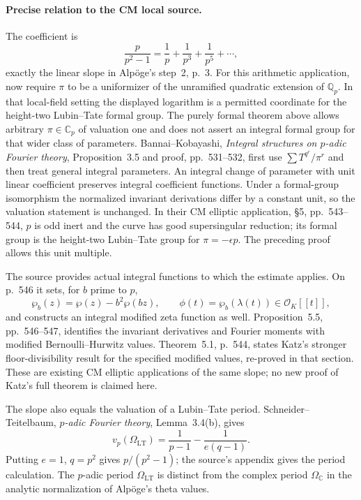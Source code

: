 \documentclass[11pt]{article}
\newcommand{\Q}{\mathbb Q}\newcommand{\C}{\mathbb C}\newcommand{\Z}{\mathbb Z}\newcommand{\R}{\mathbb R}\newcommand{\A}{\mathbb A}\newcommand{\OO}{\mathcal O}
\theoremstyle{definition}\newtheorem{definition}[theorem]{Definition}\newtheorem{remark}[theorem]{Remark}
\begin{document}
\paragraph{Precise relation to the CM local source.}
The coefficient is
\[
 \frac{p}{p^2-1}=\frac1p+\frac1{p^3}+\frac1{p^5}+\cdots,
\]
exactly the linear slope in Alp\"oge's step~2, p.~3.
For this arithmetic application, now require $\pi$ to be a
uniformizer of the unramified quadratic extension of $\Q_p$.
In that local-field setting the displayed logarithm is a permitted
coordinate for the height-two Lubin--Tate formal group.
The purely formal theorem above allows arbitrary $\pi\in\C_p$
of valuation one and does not assert an integral formal group for
that wider class of parameters.
Bannai--Kobayashi, \emph{Integral structures on $p$-adic Fourier
theory}, Proposition~3.5 and proof, pp.~531--532, first use
$\sum T^{q^r}/\pi^r$ and then treat general integral parameters.
An integral change of parameter with unit linear coefficient
preserves integral coefficient functions. Under a formal-group
isomorphism the normalized invariant derivations differ by a
constant unit, so the valuation statement is unchanged.
In their CM elliptic application, \S5, pp.~543--544, $p$ is odd
inert and the curve has good supersingular reduction; its formal
group is the height-two Lubin--Tate group for
$\pi=-\epsilon p$. The preceding proof allows this unit multiple.

The source provides actual integral functions to which the estimate
applies. On p.~546 it sets, for $b$ prime to $p$,
\[
 \wp_b(z)=\wp(z)-b^2\wp(bz),\qquad
 \phi(t)=\wp_b(\lambda(t))\in\mathcal O_K[[t]],
\]
and constructs an integral modified zeta function as well.
Proposition~5.5, pp.~546--547, identifies the invariant derivatives
and Fourier moments with modified Bernoulli--Hurwitz values.
Theorem~5.1, p.~544, states Katz's stronger floor-divisibility
result for the specified modified values, re-proved in that section.
These are existing CM elliptic applications of the same slope; no
new proof of Katz's full theorem is claimed here.

The slope also equals the valuation of a Lubin--Tate period.
Schneider--Teitelbaum, \emph{$p$-adic Fourier theory},
Lemma~3.4(b), gives
\[
 v_p(\Omega_{\mathrm{LT}})=\frac1{p-1}-\frac1{e(q-1)}.
\]
Putting $e=1$, $q=p^2$ gives $p/(p^2-1)$; the source's appendix
gives the period calculation. The $p$-adic period
$\Omega_{\mathrm{LT}}$ is distinct from the complex period
$\Omega_{\C}$ in the analytic normalization of Alp\"oge's theta
values.
\end{document}
